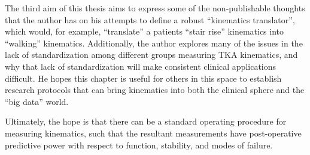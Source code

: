 The third aim of this thesis aims to express some of the non-publishable thoughts that the author has on his attempts to define a robust ``kinematics translator'', which would, for example, ``translate'' a patients ``stair rise'' kinematics into ``walking'' kinematics.
Additionally, the author explores many of the issues in the lack of standardization among different groups measuring TKA kinematics, and why that lack of standardization will make consistent clinical applications difficult.
He hopes this chapter is useful for others in this space to establish research protocols that can bring kinematics into both the clinical sphere and the ``big data'' world.

Ultimately, the hope is that there can be a standard operating procedure for measuring kinematics, such that the resultant measurements have post-operative predictive power with respect to function, stability, and modes of failure.



